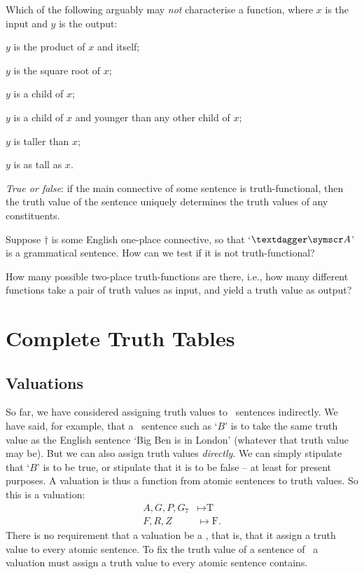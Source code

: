 \practiceproblems

\problempart Which of the following arguably may \emph{not} characterise a function, where $x$ is the input and $y$ is the output: \begin{earg}
	\item $y$ is the product of $x$ and itself;
	\item $y$ is the square root of $x$;
	\item $y$ is a child of $x$;
	\item $y$ is a child of $x$ and younger than any other child of $x$;
	\item $y$ is taller than $x$;
	\item $y$ is as tall as $x$. 
\end{earg}  
\problempart
\emph{True or false}: if the main connective of some sentence is truth-functional, then the truth value of the sentence uniquely determines the truth values of any constituents.

\problempart Suppose $†$ is some English one-place connective, so that `$†\meta{A}$' is a grammatical sentence. How can we test if it is not truth-functional?

\problempart How many possible two-place truth-functions are there, i.e., how many different functions take a pair of truth values as input, and yield a truth value as output?

\chapter{Complete Truth Tables}\label{s:CompleteTruthTables}

\section{Valuations}\label{s:valuations}

So far, we have considered assigning truth values to \TFL\ sentences indirectly. We have said, for example, that a \TFL\ sentence such as `$B$' is to take the same truth value as the English sentence `Big Ben is in London' (whatever that truth value may be). But we can also assign truth values \emph{directly}. We can simply stipulate that `$B$' is to be true, or stipulate that it is to be false – at least for present purposes. 
A valuation is thus a function from atomic sentences to truth values. So this is a valuation: \begin{align*}
	A, G, P, G_{7}  &\mapsto \text{T}\\ 
	F, R, Z &\mapsto \text{F}.
\end{align*} There is no requirement that a valuation be a , that is, that it assign a truth value to every atomic sentence. To fix the truth value of a sentence  of \TFL\ a valuation must assign a truth value to every atomic sentence  contains.



